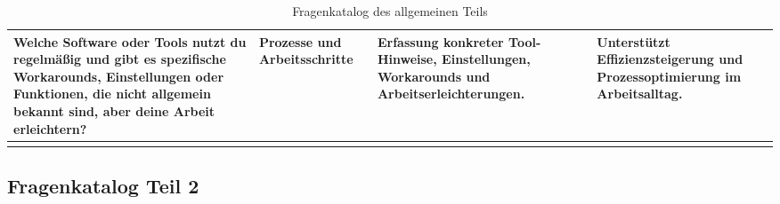 \documentclass[
  10pt,
  ngerman,
  a4paper,
  toc=graduated,
  numbers=noenddot,
  headings=standardclasses,
  nonumberlist
]{scrartcl}
\renewcommand{\arraystretch}{1.0}
\begin{document}
\begin{longtable}{|L{4.9cm}|L{3.1cm}|L{3.8cm}|L{3.3cm}|}
Welche Software oder Tools nutzt du regelmäßig und gibt es spezifische Workarounds, Einstellungen oder Funktionen, die nicht allgemein bekannt sind, aber deine Arbeit erleichtern?
& Prozesse und Arbeitsschritte
& Erfassung konkreter Tool-Hinweise, Einstellungen, Workarounds und Arbeitserleichterungen.
& Unterstützt Effizienzsteigerung und Prozessoptimierung im Arbeitsalltag. \\
\hline
\caption{Fragenkatalog des allgemeinen Teils}
\label{tab:fragenkatalog_teil_1}
\end{longtable}

\clearpage
\subsection{Fragenkatalog Teil 2}
\label{anhang_fragenkatalog_2}

\setlength{\tabcolsep}{3.5pt}
\renewcommand{\arraystretch}{1.0}
\end{document}
